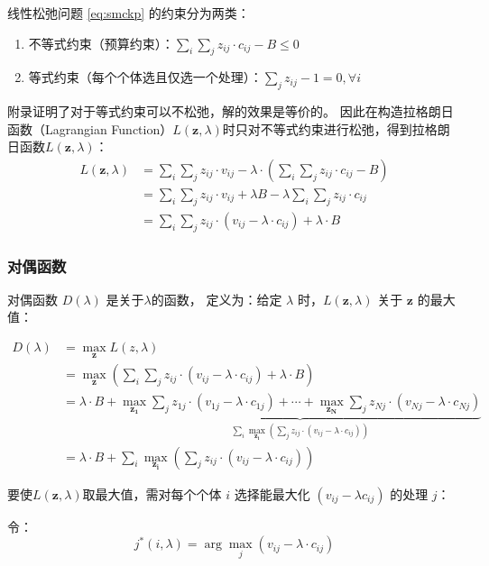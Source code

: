 线性松弛问题 \eqref{eq:smckp} 的约束分为两类：
\begin{enumerate}
    \item 不等式约束（预算约束）：$\sum_{i}\sum_{j} z_{ij} \cdot c_{ij} - B \leq 0$
    \item 等式约束（每个个体选且仅选一个处理）：$\sum_{j} z_{ij} - 1 = 0, \forall i$
\end{enumerate}


附录证明了对于等式约束可以不松弛，解的效果是等价的。
因此在构造拉格朗日函数（Lagrangian Function）$L(\bm z,\lambda)$时只对不等式约束进行松弛，得到拉格朗日函数$L(\bm{z},\lambda)$：
\begin{align}
L(\bm{z}, \lambda) &= \sum_{i}\sum_{j} z_{ij} \cdot v_{ij} - \lambda \cdot \left( \sum_{i}\sum_{j} z_{ij} \cdot c_{ij}-B\right)\\
&= \sum_{i}\sum_{j} z_{ij} \cdot v_{ij} + \lambda B - \lambda \sum_{i}\sum_{j} z_{ij} \cdot c_{ij}  \\
&= \sum_{i}\sum_{j} z_{ij} \cdot (v_{ij} - \lambda \cdot c_{ij} ) + \lambda \cdot B 
\end{align}
\subsubsection{对偶函数}
对偶函数 $D(\lambda)$ 是关于$\lambda$的函数，
定义为：给定 $\lambda$ 时，$L(\bm{z}, \lambda)$ 关于 $\bm{z}$ 的最大值：

\begin{align}\label{eq:dualfunction}
D(\lambda) &= \max_{\bm{z}} L(z, \lambda) \\
&= \max_{\bm{z}} \left( \sum_{i}\sum_{j} z_{ij} \cdot (v_{ij} - \lambda \cdot c_{ij} ) + \lambda \cdot B  \right)\\
&= \lambda \cdot B + \underbrace{\max_{\bm{z_1}}  \sum_{j} z_{1j} \cdot (v_{1j} - \lambda \cdot c_{1j} ) + \cdots + \max_{\bm{z_N}}  \sum_{j} z_{Nj} \cdot (v_{Nj} - \lambda \cdot c_{Nj} )}_{\sum_{i}\max_{\bm{z_{i}}} \left(\sum_{j} z_{ij} \cdot (v_{ij} - \lambda \cdot c_{ij} ) \right)}\\
&=  \lambda \cdot B +\sum_{i}\max_{\bm{z_{i}}} \left(\sum_{j} z_{ij} \cdot (v_{ij} - \lambda \cdot c_{ij} ) \right) 
\end{align}

要使$L(\bm z,\lambda)$取最大值，需对每个个体 $i$ 选择能最大化 $(v_{ij} - \lambda c_{ij})$ 的处理 $j$：

令：
\begin{equation}
j^{*}(i, \lambda) = \arg\max_{j} (v_{ij} - \lambda \cdot c_{ij})
\end{equation}

